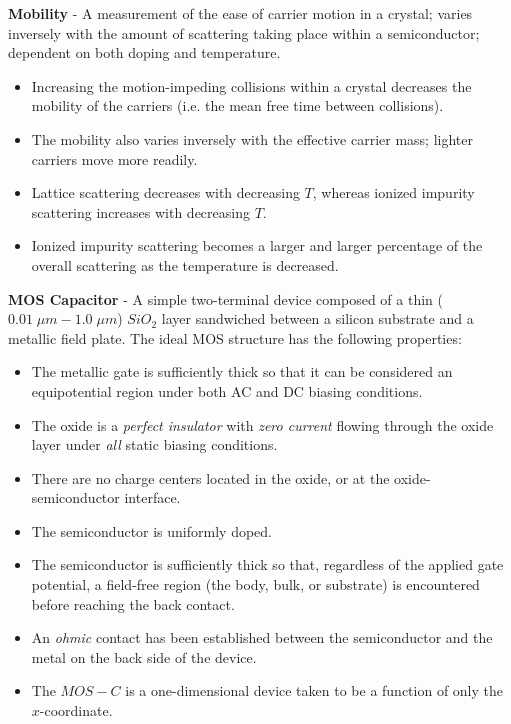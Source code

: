 \vspace{0.5cm}
\noindent
    \textbf{Mobility} - A measurement of the ease of carrier motion in a crystal; varies inversely with the amount of scattering taking place within a semiconductor; dependent on both doping and temperature.
    \vspace{0.15cm}
    \begin{itemize}
        \setlength\itemsep{0.5em}
        \item{Increasing the motion-impeding collisions within a crystal decreases the mobility of the carriers (i.e. the mean free time between collisions).}
        \item{The mobility also varies inversely with the effective carrier mass; lighter carriers move more readily.}
        \item{Lattice scattering decreases with decreasing $T$, whereas ionized impurity scattering increases with decreasing $T$.}
        \item{Ionized impurity scattering becomes a larger and larger percentage of the overall scattering as the temperature is decreased.}
    \end{itemize}
\vspace{0.5cm}
    \textbf{MOS Capacitor} - A simple two-terminal device composed of a thin ($0.01\;\mu m - 1.0\;\mu m$) ${SiO}_2$ layer sandwiched between a silicon substrate and a metallic field plate.  The ideal MOS structure has the following properties:
    \vspace{0.15cm}
    \begin{itemize}
        \setlength\itemsep{0.5em}
        \item{The metallic gate is sufficiently thick so that it can be considered an equipotential region under both AC and DC biasing conditions.}
        \item{The oxide is a \emph{perfect insulator} with \emph{zero current} flowing through the oxide layer under \emph{all} static biasing conditions.}
        \item{There are no charge centers located in the oxide, or at the oxide-semiconductor interface.}
        \item{The semiconductor is uniformly doped.}
        \item{The semiconductor is sufficiently thick so that, regardless of the applied gate potential, a field-free region (the body, bulk, or substrate) is encountered before reaching the back contact.}
        \item{An \emph{ohmic} contact has been established between the semiconductor and the metal on the back side of the device.}
        \item{The $MOS-C$ is a one-dimensional device taken to be a function of only the $x$-coordinate.}
    \end{itemize}
